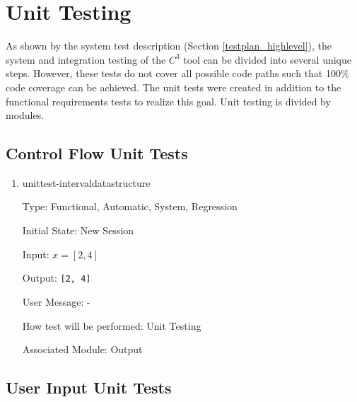 \documentclass[12pt, titlepage]{article}
\newcommand{\prognameAbbrv}{$C^{3}$}
\begin{document}
\section{Unit Testing}
		
As shown by the system test description (Section \ref{testplan_highlevel}), the 
system and integration testing of the \prognameAbbrv{} tool can be divided into 
several unique steps. However, these tests do not cover all possible code paths 
such that 100\% code coverage can be achieved. The unit tests were created in 
addition to the functional requirements tests to realize this goal. Unit 
testing is divided by modules.

\subsection{Control Flow Unit Tests}

\begin{enumerate}
	
	\item{unittest-intervaldatastructure}
	
	Type: Functional, Automatic, System, Regression
	
	Initial State: New Session
	
	Input: $x = [2,4]$
	
	Output: \texttt{[2, 4]}
	
	User Message: - 
	
	How test will be performed: Unit Testing
	
	Associated Module: Output\\
	
\end{enumerate}

\subsection{User Input Unit Tests}
\end{document}
